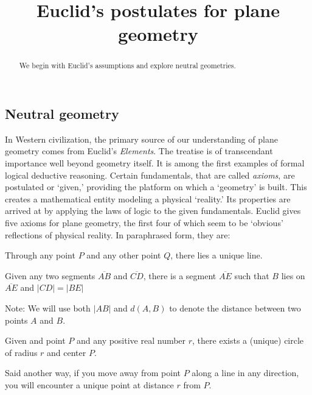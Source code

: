 \documentclass{ximera}
\title{Euclid's postulates for plane geometry} %
\begin{document}
\begin{abstract}
We begin with Euclid's assumptions and explore neutral geometries.
\end{abstract}
\maketitle



\subsection*{Neutral geometry}


In Western civilization, the primary source of our understanding of
plane geometry comes from Euclid's \textit{Elements}. The treatise is
of transcendant importance well beyond geometry itself. It is among
the first examples of formal logical deductive reasoning. Certain
fundamentals, that are called \textit{axioms}, are postulated or
`given,' providing the platform on which a `geometry' is built. This
creates a mathematical entity modeling a physical `reality.' Its
properties are arrived at by applying the laws of logic to the given
fundamentals. Euclid gives five axioms for plane geometry, the first
four of which seem to be `obvious' reflections of physical reality. In
paraphrased form, they are:

\begin{axiom}[E1]
Through any point $P$ and any other point $Q$, there lies a unique
line.
\end{axiom}

\begin{axiom}[E2] 
Given any two segments $\overline{AB}$ and $\overline{CD}$, there is a
segment $\overline{AE}$ such that $B$ lies on $\overline{AE}$ and
$\left\vert CD\right\vert =\left\vert BE\right\vert $

Note: We will use both $\left\vert AB\right\vert$ and $d(A,B)$ to
denote the distance between two points $A$ and $B$.
\end{axiom}

\begin{axiom}[E3]
Given and point $P$ and any positive real number $r$, there exists a
(unique) circle of radius $r$ and center $P$. 

Said another way, if you move away from point $P$ along a line in any
direction, you will encounter a unique point at distance $r$ from $P$.
\end{axiom}
\end{document}
